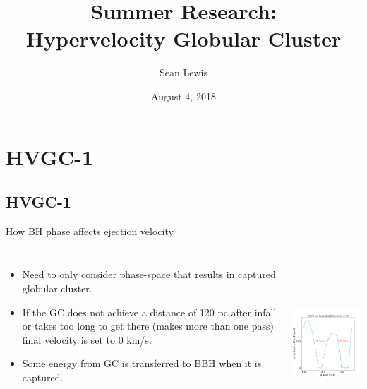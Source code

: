\documentclass[aspectratio=169]{beamer}
\author[S.~Lewis]{Sean Lewis}
\date[2018-24-07]{August 4, 2018}
\title[Progress Report]{\Huge Summer Research: \\ Hypervelocity Globular Cluster}
\institute{Drexel University}
\begin{document}
\begin{frame}
  \maketitle
\end{frame}

\section{HVGC-1}
\subsection{HVGC-1}

\begin{frame}
  {How BH phase affects ejection velocity}
  \begin{columns}
    \begin{itemize}
      \item Need to only consider phase-space that results in captured globular cluster. 
      \item If the GC does not achieve a distance of 120 pc after infall or takes too long to get there (makes more than one pass) final velocity is set to 0 km/s.
      \item Some energy from GC is transferred to BBH when it is captured.
    \end{itemize}
    \includegraphics[width=6.4cm, height=6.4cm]{./Images/phase_loop_curated.png}
    \centering
  \end{columns}
\end{frame}
\end{document}
